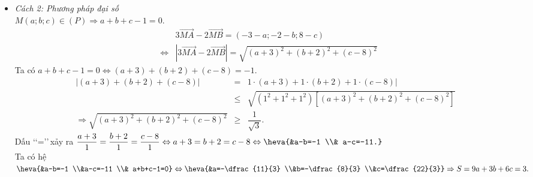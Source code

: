 \begin{ex}
{\begin{itemize}
$${				&c=\dfrac{22}{3}}
				\Rightarrow S=9a+3b+6c=3.
		$$
	\item \textit{Cách 2: Phương pháp đại số}\,\\
	$M(a ; b ; c) \in(P) \Rightarrow a+b+c-1=0.$
	\begin{eqnarray*}
		& & 3 \vec{M A}-2 \vec{M B}=(-3-a ;-2-b ; 8-c)\\
		&\Leftrightarrow & |3 \vec{M A}-2 \vec{M B}|=\sqrt{(a+3)^2+(b+2)^2+(c-8)^2}
	\end{eqnarray*}
		Ta có $a+b+c-1=0 \Leftrightarrow(a+3)+(b+2)+(c-8)=-1$.
		\begin{eqnarray*}
			|(a+3)+(b+2)+(c-8)|
			&=& 1 \cdot(a+3)+1 \cdot(b+2)+1 \cdot(c-8)| \\
			&\leq & \sqrt{\left(1^2+1^2+1^2\right)\left[(a+3)^2+(b+2)^2+(c-8)^2\right]} \\
			\Rightarrow \sqrt{(a+3)^2+(b+2)^2+(c-8)^2} &\geq& \dfrac{1}{\sqrt{3}}.
		\end{eqnarray*}
		Dấu \lq\lq=\rq\rq\,xảy ra $\dfrac{a+3}{1}=\dfrac{b+2}{1}=\dfrac{c-8}{1} \Leftrightarrow a+3=b+2=c-8 \Leftrightarrow\heva{&a-b=-1 \\& a-c=-11.}$\\
		Ta có hệ $\heva{&a-b=-1 \\&a-c=-11 \\& a+b+c-1=0} \Leftrightarrow\heva{&a=-\dfrac{11}{3} \\&b=-\dfrac{8}{3} \\&c=\dfrac{22}{3}}\Rightarrow S=9a+3b+6c=3.$		
	\end{itemize}
	}
\end{ex}

